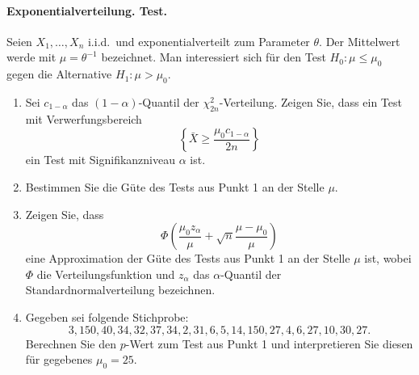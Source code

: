 \paragraph{Exponentialverteilung. Test.} Seien $X_1,\ldots,X_n$ i.i.d.\ und exponentialverteilt
zum Parameter $\theta$. Der Mittelwert werde mit $\mu=\theta^{-1}$ bezeichnet.
Man interessiert sich für den Test $H_0 : \mu \leq \mu_0$ gegen die Alternative $H_1 : \mu > \mu_0$.
\begin{enumerate}
    \item Sei $c_{1-\alpha}$ das $(1-\alpha)$-Quantil der $\chi^2_{2n}$-Verteilung. Zeigen Sie, dass
        ein Test mit Verwerfungsbereich
        \begin{equation*}
            \left\{ \bar X \geq \frac{\mu_0 c_{1-\alpha}}{2n} \right\}
        \end{equation*}
        ein Test mit Signifikanzniveau $\alpha$ ist.
    \item Bestimmen Sie die Güte des Tests aus Punkt 1 an der Stelle $\mu$.
    \item Zeigen Sie, dass 
        \begin{equation*}
            \Phi\left( \frac{\mu_0 z_\alpha}{\mu} + \sqrt{n} \frac{\mu-\mu_0}{\mu} \right) 
        \end{equation*}
        eine Approximation der Güte des Tests aus Punkt 1 an der Stelle $\mu$ ist, wobei $\Phi$ die
        Verteilungsfunktion und $z_\alpha$ das $\alpha$-Quantil der Standardnormalverteilung bezeichnen.
    \item Gegeben sei folgende Stichprobe:
        \begin{equation*}
            3,150,40,34,32,37,34,2,31,6,5,14,150,27,4,6,27,10,30,27.
        \end{equation*}
        Berechnen Sie den $p$-Wert zum Test aus Punkt 1 und interpretieren Sie diesen für gegebenes $\mu_0=25$.
\end{enumerate}

